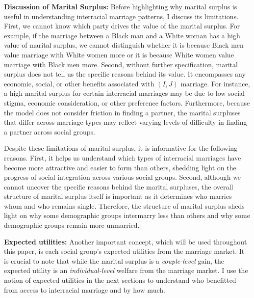  
 \vspace{3mm}
  \noindent \textbf{Discussion of Marital Surplus:} Before highlighting why marital surplus is useful in understanding interracial marriage patterns, I discuss its limitations. First, we cannot know which party drives the value of the marital surplus. For example, if the marriage between a Black man and a White woman has a high value of marital surplus, we cannot distinguish whether it is because Black men value marriage with White women more or it is because White women value marriage with Black men more. Second, without further specification, marital surplus does not tell us the specific reasons behind its value. It encompasses any economic, social, or other benefits associated with $(I,J)$ marriage. For instance, a high marital surplus for certain interracial marriages may be due to low social stigma, economic consideration, or other preference factors. Furthermore, because the model does not consider friction in finding a partner, the marital surpluses that differ across marriage types may reflect varying levels of difficulty in finding a partner across social groups.

Despite these limitations of marital surplus, it is informative for the following reasons. First, it helps us understand which types of interracial marriages have become more attractive and easier to form than others, shedding light on the progress of social integration across various social groups. Second, although we cannot uncover the specific reasons behind the marital surpluses, the overall structure of marital surplus itself is important as it determines who marries whom and who remains single. Therefore, the structure of marital surplus sheds light on why some demographic groups intermarry less than others and why some demographic groups remain more unmarried.

\vspace{3mm}
\noindent\textbf{Expected utilities:} Another important concept, which will be used throughout this paper, is each social group's expected utilities from the marriage market. It is crucial to note that while the marital surplus is a \textit{couple-level} gain, the expected utility is an \textit{individual-level} welfare from the marriage market. I use the notion of expected utilities in the next sections to understand who benefitted from access to interracial marriage and by how much. 

